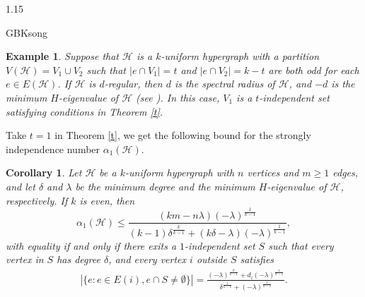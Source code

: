 \documentclass[preprint,12pt]{elsarticle}
\newtheorem{cor}[thm]{Corollary}
\newtheorem{example}[thm]{Example}
\begin{document}
\begin{spacing}{1.15}
\begin{CJK*}{GBK}{song}
\begin{example}
Suppose that $\mathcal{H}$ is a $k$-uniform hypergraph with a partition $V(\mathcal{H})=V_1\cup V_2$ such that $|e\cap V_1|=t$ and $|e\cap V_2|=k-t$ are both odd for each $e\in E(\mathcal{H})$. If $\mathcal{H}$ is $d$-regular, then $d$ is the spectral radius of $\mathcal{H}$, and $-d$ is the minimum $H$-eigenvalue of $\mathcal{H}$ (see \cite[Theorem 2.3]{Shao}). In this case, $V_1$ is a $t$-independent set satisfying conditions in Theorem \ref{t}.
\end{example}
Take $t=1$ in Theorem \ref{t}, we get the following bound for the strongly independence number $\alpha_1(\mathcal{H})$.
\begin{cor}\label{1}
Let $\mathcal{H}$ be a $k$-uniform hypergraph with $n$ vertices and $m\geq1$ edges, and let $\delta$ and $\lambda$ be the minimum degree and the minimum $H$-eigenvalue of $\mathcal{H}$, respectively. If $k$ is even, then
\[{\alpha}_1(\mathcal{H}) \leqslant \frac{{\left( {km - n \lambda } \right){{\left( { - \lambda } \right)}^{\frac{1}{{k - 1}}}}}}{{\left( {k - 1} \right){\delta ^{\frac{k}{{k - 1}}}} + \left( {k \delta  - \lambda } \right){{\left( { - \lambda } \right)}^{\frac{1}{{k - 1}}}}}},\]
with equality if and only if there exits a $1$-independent set $S$ such that every vertex in $S$ has degree $\delta$, and every vertex $i$ outside $S$ satisfies
\begin{eqnarray*}
\left| {\{ e:e \in E(i),e\cap S \ne \emptyset \} } \right| = \frac{{{{\left( { - \lambda } \right)}^{\frac{k}{{k - 1}}}} + {d_i}{{\left( { - \lambda } \right)}^{\frac{1}{{k - 1}}}}}}{{{\delta ^{\frac{1}{{k - 1}}}} + {{\left( { - \lambda } \right)}^{\frac{1}{{k - 1}}}}}}.
\end{eqnarray*}
\end{cor}


\end{CJK*}
\end{spacing}
\end{document}
